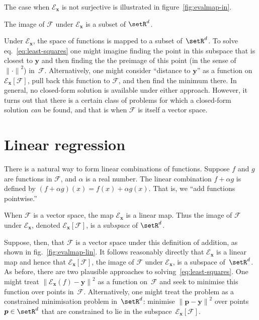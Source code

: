 \documentclass[10pt, a4paper]{article}
\newcommand{\evalmap}{\mathcal{E}_{\bm{x}}}
\begin{document}
The case when $\mathcal{E}_{\bm{x}}$ is not surjective is illustrated in
figure~\ref{fig:evalmap-in}.
\begin{marginfigure}
  \begin{center}
  \end{center}
  \caption{The image of $\mathcal{F}$ under $\mathcal{E}_{\bm{x}}$ is a subset of
    $\setR^d$.\label{fig:evalmap-in}}
\end{marginfigure}
Under $\mathcal{E}_{\bm{x}}$, the space of functions is mapped to a subset
of~$\setR^d$. To solve eq.~\eqref{eq:least-squares} one might imagine
finding the point in this subspace that is closest to $\bm{y}$ and
then finding the the preimage of this point (in the sense of
${\lVert\cdot\rVert}^2$) in~$\mathcal{F}$. Alternatively, one might consider
“distance to $\bm{y}$” as a function on
$\mathcal{E}_{\bm{x}}[\mathcal{F}]$, pull back this function to
$\mathcal{F}$, and then find the minimum there. In general, no closed-form
solution is available under either approach. However, it turns out
that there is a certain class of problems for which a closed-form
solution \emph{can} be found, and that is when $\mathcal{F}$ is itself a vector
space.

\section{Linear regression}

There is a natural way to form linear combinations of
functions. Suppose $f$ and $g$ are functions in $\mathcal{F}$, and
$\alpha$ is a real number. The linear combination $f+\alpha g$ is defined by
$(f+\alpha g)(x) = f(x)+\alpha g(x)$. That is, we “add functions pointwise.”

\begin{marginfigure}
  \begin{center}
  \end{center}
  \caption{When $\mathcal{F}$ is a vector space, the map
    $\mathcal{E}_{\bm{x}}$ is a linear map. Thus the image of
    $\mathcal{F}$ under $\mathcal{E}_{\bm{x}}$, denoted
    $\mathcal{E}_{\bm{x}}[\mathcal{F}]$, is a sub\emph{space} of
    $\setR^d$.\label{fig:evalmap-lin}}
\end{marginfigure}
Suppose, then, that $\mathcal{F}$ is a vector space under this definition of
addition, as shown in fig.~\ref{fig:evalmap-lin}. It follows
reasonably directly that $\mathcal{E}_{\bm{x}}$ is a linear map and hence that
$\mathcal{E}_{\bm{x}}[\mathcal{F}]$, the image of $\mathcal{F}$ under
$\mathcal{E}_{\bm{x}}$, is a subspace of~$\setR^d$. As before, there are two
plausible approaches to solving~\eqref{eq:least-squares}. One might
treat ${\lVert \evalmap(f)-\bm{y}\rVert}^2$ as a function on~$\mathcal{F}$ and
seek to minimise this function over points in~$\mathcal{F}$. Alternatively, one
might treat the problem as a constrained minimisation problem
in~$\setR^d$: minimise ${\lVert \bm{p}-\bm{y}\rVert}^2$ over points
$\bm{p}\in\setR^d$ that are constrained to lie in the
subspace~$\evalmap[\mathcal{F}]$.
\end{document}
